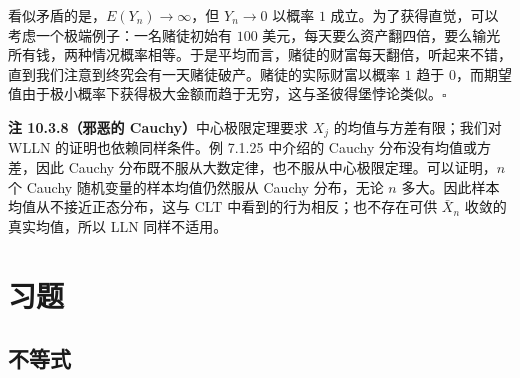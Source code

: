 \documentclass[UTF8, 12pt, fontset=fandol, oneside]{ctexart}
\begin{document}
看似矛盾的是，$E(Y_n)\to\infty$，但 $Y_n\to 0$ 以概率 $1$ 成立。为了获得直觉，可以考虑一个极端例子：一名赌徒初始有 $100$ 美元，每天要么资产翻四倍，要么输光所有钱，两种情况概率相等。于是平均而言，赌徒的财富每天翻倍，听起来不错，直到我们注意到终究会有一天赌徒破产。赌徒的实际财富以概率 $1$ 趋于 $0$，而期望值由于极小概率下获得极大金额而趋于无穷，这与圣彼得堡悖论类似。$\square$

\noindent\textbf{注 10.3.8（邪恶的 Cauchy）}\quad 中心极限定理要求 $X_j$ 的均值与方差有限；我们对 WLLN 的证明也依赖同样条件。例 7.1.25 中介绍的 Cauchy 分布没有均值或方差，因此 Cauchy 分布既不服从大数定律，也不服从中心极限定理。可以证明，$n$ 个 Cauchy 随机变量的样本均值仍然服从 Cauchy 分布，无论 $n$ 多大。因此样本均值从不接近正态分布，这与 CLT 中看到的行为相反；也不存在可供 $\bar X_n$ 收敛的真实均值，所以 LLN 同样不适用。

\section*{习题}

\subsection*{不等式}
\end{document}
